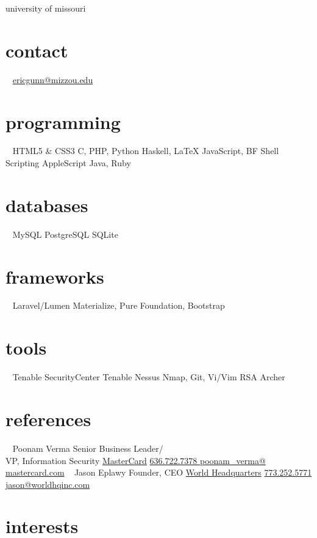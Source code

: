 \documentclass[print]{gunn-resume}
\begin{document}
       {university of missouri}


\begin{aside}
  \section{contact}
  ~
    \href{mailto:ericgunn@mizzou.edu}{ericgunn@mizzou.edu}
  \section{programming}
  ~
    HTML5 \& CSS3
    C, PHP, Python
    Haskell, \LaTeX
    JavaScript, BF
    Shell Scripting
    AppleScript
    Java, Ruby
 \section{databases}
 ~
 MySQL
 PostgreSQL
 SQLite
 \section{frameworks}
 ~
 Laravel/Lumen
 Materialize, Pure
 Foundation, Bootstrap
 \section{tools}
 ~
 Tenable SecurityCenter
 Tenable Nessus
 Nmap, Git, Vi/Vim
 RSA Archer
 \section{references}
 ~
 Poonam Verma
 Senior Business Leader/\\VP, Information Security
 \href{http://mastercard.com}{MasterCard}
 \href{16367227378 }{636.722.7378 }
\href{mailto:poonam_verma@mastercard.com}{poonam\_verma@\\mastercard.com}
 ~
 Jason Eplawy
 Founder, CEO
 \href{http://worldhqinc.com}{World Headquarters}
 \href{17732525771}{773.252.5771}
\href{mailto:jason@worldhqinc.com}{jason@worldhqinc.com}
 ~
\end{aside}

\section{interests}
\end{document}
